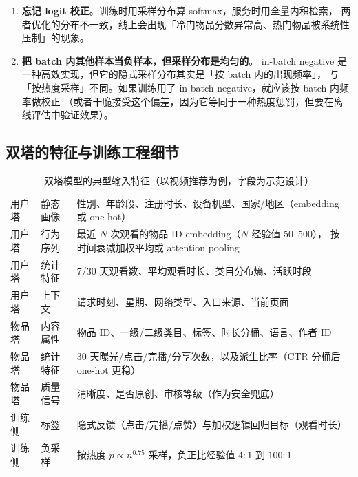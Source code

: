 \begin{pitfall}
\begin{enumerate}
  \item \textbf{忘记 logit 校正}。训练时用采样分布算 softmax，服务时用全量内积检索，
        两者优化的分布不一致，线上会出现「冷门物品分数异常高、热门物品被系统性压制」的现象。
  \item \textbf{把 batch 内其他样本当负样本，但采样分布是均匀的}。
        in-batch negative 是一种高效实现，但它的隐式采样分布其实是「按 batch 内的出现频率」，
        与「按热度采样」不同。如果训练用了 in-batch negative，就应该按 batch 内频率做校正
        （或者干脆接受这个偏差，因为它等同于一种热度惩罚，但要在离线评估中验证效果）。
\end{enumerate}
\end{pitfall}

\subsection{双塔的特征与训练工程细节}

\begin{table}[htbp]
\centering
\caption{双塔模型的典型输入特征（以视频推荐为例，字段为示范设计）}
\label{tab:tower-features}
\small
\begin{tabularx}{\textwidth}{L{2.1cm} L{2.0cm} Y}
\toprule
{} &  &  \\
\midrule
用户塔 & 静态画像 & 性别、年龄段、注册时长、设备机型、国家/地区（embedding 或 one-hot） \\
用户塔 & 行为序列 & 最近 $N$ 次观看的物品 ID embedding（$N$ 经验值 50--500），
按时间衰减加权平均或 attention pooling \\
用户塔 & 统计特征 & 7/30 天观看数、平均观看时长、类目分布熵、活跃时段 \\
用户塔 & 上下文 & 请求时刻、星期、网络类型、入口来源、当前页面 \\
物品塔 & 内容属性 & 物品 ID、一级/二级类目、标签、时长分桶、语言、作者 ID \\
物品塔 & 统计特征 & 30 天曝光/点击/完播/分享次数，以及派生比率（CTR 分桶后 one-hot 更稳） \\
物品塔 & 质量信号 & 清晰度、是否原创、审核等级（作为安全兜底） \\
训练侧 & 标签 & 隐式反馈（点击/完播/点赞）与加权逻辑回归目标（观看时长） \\
训练侧 & 负采样 & 按热度 $p \propto n^{0.75}$ 采样，负正比经验值 $4:1$ 到 $100:1$ \\
\bottomrule
\end{tabularx}
\end{table}

